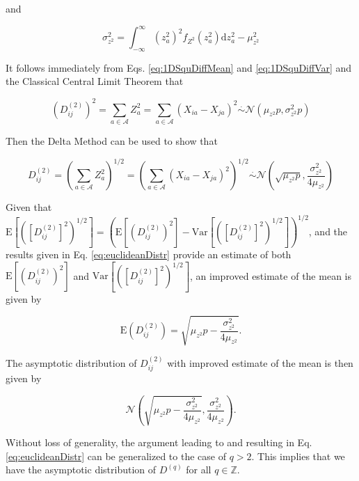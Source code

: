 \documentclass[10pt,letterpaper]{article}\usepackage[]{graphicx}\usepackage[]{color}
\begin{document}
and

\begin{equation}\label{eq:1DSquDiffVar}
\sigma^2_{z^2} = \int_{-\infty}^{\infty} (z^2_a)^2 f_{Z^2}(z^2_a) \text{d}z^2_a - \mu^2_{z^2}
\end{equation}

It follows immediately from Eqs. \ref{eq:1DSquDiffMean} and \ref{eq:1DSquDiffVar} and the Classical Central Limit Theorem that

\begin{equation}\label{eq:SquDiffDistrGeneral}
\left(D^{(2)}_{ij}\right)^2 = \sum_{a \in \mathcal{A}} Z^2_a = \sum_{a \in \mathcal{A}} (X_{ia} - X_{ja})^2 \overset{.}{\sim} \mathcal{N}\left(\mu_{z^2}p,\sigma^2_{z^2}p\right)
\end{equation}

Then the Delta Method \cite{allStats} can be used to show that

\begin{equation}\label{eq:euclideanDistr}
D^{(2)}_{ij} = \left(\sum_{a \in \mathcal{A}} Z^2_a\right)^{1/2} = \left(\sum_{a \in \mathcal{A}} (X_{ia} - X_{ja})^2\right)^{1/2} \overset{.}{\sim} \mathcal{N}\left(\sqrt{\mu_{z^2}p},\frac{\sigma^2_{z^2}}{4\mu_{z^2}}\right)
\end{equation}

Given that $\text{E}\left[\left(\left[D^{(2)}_{ij}\right]^2\right)^{1/2}\right] = \left(\text{E}\left[\left(D^{(2)}_{ij}\right)^2\right] - \text{Var}\left[\left(\left[D^{(2)}_{ij}\right]^2\right)^{1/2}\right]\right)^{1/2}$, and the results given in Eq. \ref{eq:euclideanDistr} provide an estimate of both $\text{E}\left[\left(D^{(2)}_{ij}\right)^2\right]$ and $\text{Var}\left[\left(\left[D^{(2)}_{ij}\right]^2\right)^{1/2}\right]$, an improved estimate of the mean is given by

\begin{equation}\label{eq:euclideanMean}
\text{E}\left(D^{(2)}_{ij}\right) = \sqrt{\mu_{z^2}p - \frac{\sigma^2_{z^2}}{4\mu_{z^2}}}.
\end{equation}

The asymptotic distribution of $D^{(2)}_{ij}$ with improved estimate of the mean is then given by

\begin{equation}
\mathcal{N}\left(\sqrt{\mu_{z^2}p - \frac{\sigma^2_{z^2}}{4\mu_{z^2}}},\frac{\sigma^2_{z^2}}{4\mu_{z^2}}\right).
\end{equation}

Without loss of generality, the argument leading to and resulting in Eq. \ref{eq:euclideanDistr} can be generalized to the case of $q>2$. This implies that we have the asymptotic distribution of $D^{(q)}$ for all $q \in \mathbb{Z}$.
\end{document}
